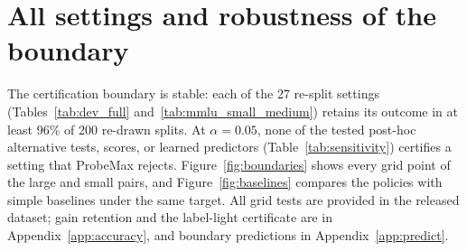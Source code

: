 \section{All settings and robustness of the boundary}\label{app:ledger}

The certification boundary is stable: each of the 27 re-split settings (Tables~\ref{tab:dev_full} and~\ref{tab:mmlu_small_medium}) retains its outcome in at least 96\% of 200 re-drawn splits. At $\alpha=0.05$, none of the tested post-hoc alternative tests, scores, or learned predictors (Table~\ref{tab:sensitivity}) certifies a setting that ProbeMax rejects. Figure~\ref{fig:boundaries} shows every grid point of the large and small pairs, and Figure~\ref{fig:baselines} compares the policies with simple baselines under the same target. All grid tests are provided in the released dataset; gain retention and the label-light certificate are in Appendix~\ref{app:accuracy}, and boundary predictions in Appendix~\ref{app:predict}.

